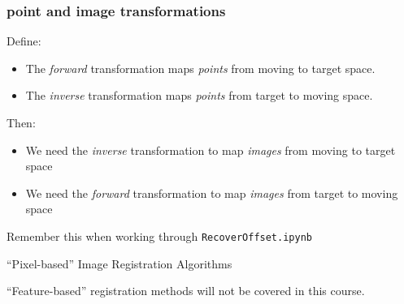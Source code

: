 \documentclass[aspectratio=169]{beamer}
\newcommand{\code}[1]{\texttt{#1}}
\begin{document}
\begin{frame}[plain]
\end{frame}


\begin{frame}[plain]%
\frametitle{point and image transformations}
    
    \vspace{2.0em}
    Define:
    \begin{itemize}
        \item The \emph{forward} transformation maps \emph{points} from
            \newline moving to target space.
        \item The \emph{inverse} transformation maps \emph{points} from
            \newline target to moving space.
    \end{itemize}

    Then:
    \begin{itemize}
        \item We need the \emph{inverse} transformation to map
            \emph{images} from \newline moving to target space
        \item We need the \emph{forward} transformation to map
            \emph{images} from \newline target to moving space
    \end{itemize}
    
    \vspace{0.8em}
    Remember this when working through \code{RecoverOffset.ipynb}

\end{frame}


\begin{frame}

    \vspace{5em}
    \begin{center}
        \LARGE{ \color{HHMIGreenB} ``Pixel-based'' Image Registration Algorithms }
    \end{center}

    \vspace{0.8em}
    \begin{center}
        \small { \color{gray} ``Feature-based'' registration methods will not be covered in this course. }
    \end{center}

\end{frame}
\end{document}
